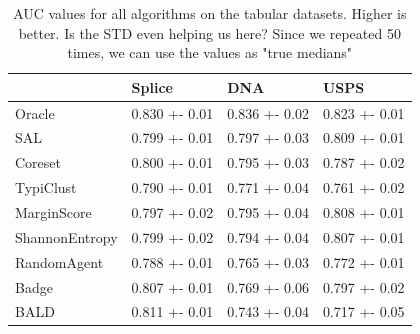 \documentclass[]{article}
\begin{document}
\begin{table}[]
	\centering
	\begin{tabular}{l|lll}
		& Splice        & DNA           & USPS          \\
		\hline
		Oracle          & 0.830 +- 0.01 & 0.836 +- 0.02 & 0.823 +- 0.01 \\
		SAL & 0.799 +- 0.01 & 0.797 +- 0.03 & 0.809 +- 0.01 \\
		Coreset & 0.800 +- 0.01 & 0.795 +- 0.03 & 0.787 +- 0.02 \\
		TypiClust       & 0.790 +- 0.01 & 0.771 +- 0.04 & 0.761 +- 0.02 \\
		MarginScore     & 0.797 +- 0.02 & 0.795 +- 0.04 & 0.808 +- 0.01 \\
		ShannonEntropy  & 0.799 +- 0.02 & 0.794 +- 0.04 & 0.807 +- 0.01 \\
		RandomAgent     & 0.788 +- 0.01 & 0.765 +- 0.03 & 0.772 +- 0.01 \\
		Badge           & 0.807 +- 0.01 & 0.769 +- 0.06 & 0.797 +- 0.02 \\
		BALD            & 0.811 +- 0.01 & 0.743 +- 0.04 & 0.717 +- 0.05
	\end{tabular}
	\caption{AUC values for all algorithms on the tabular datasets. Higher is better.
	{\color{red}Is the STD even helping us here? Since we repeated 50 times, we can use the values as "true medians"} }
\end{table}
%
\end{document}
